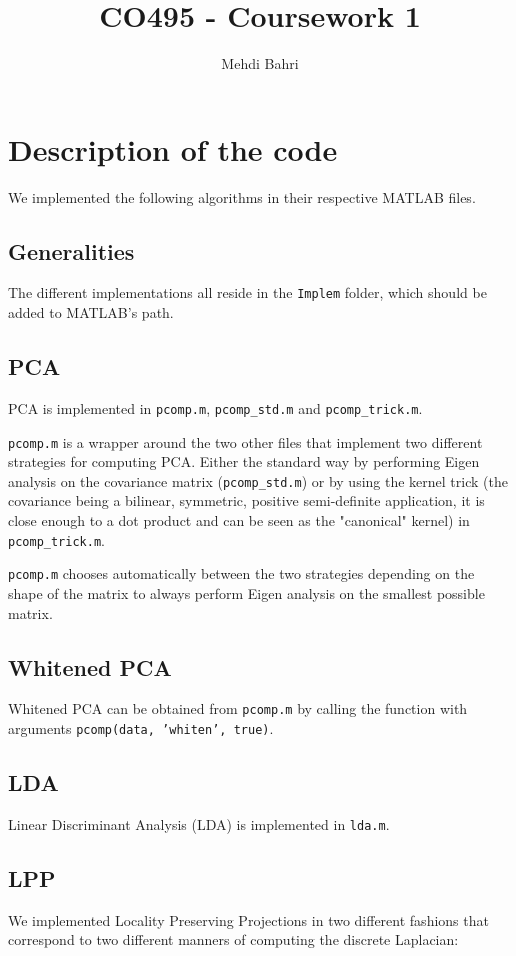 \documentclass[10pt, a4paper]{article}
\title{CO495 - Coursework 1}
\author{Mehdi Bahri}
\begin{document}
\maketitle

\tableofcontents

\section{Description of the code}
We implemented the following algorithms in their respective MATLAB files.

\subsection{Generalities}
The different implementations all reside in the \texttt{Implem} folder, which should be added to MATLAB's path.

\subsection{PCA}
PCA is implemented in \texttt{pcomp.m}, \texttt{pcomp\_std.m} and \texttt{pcomp\_trick.m}.

\texttt{pcomp.m} is a wrapper around the two other files that implement two different strategies for computing PCA. Either the standard way by performing Eigen analysis on the covariance matrix (\texttt{pcomp\_std.m}) or by using the kernel trick (the covariance being a bilinear, symmetric, positive semi-definite application, it is close enough to a dot product and can be seen as the "canonical" kernel) in \texttt{pcomp\_trick.m}.

\texttt{pcomp.m} chooses automatically between the two strategies depending on the shape of the matrix to always perform Eigen analysis on the smallest possible matrix.

\subsection{Whitened PCA}

Whitened PCA can be obtained from \texttt{pcomp.m} by calling the function with arguments \texttt{pcomp(data, 'whiten', true)}.

\subsection{LDA}
Linear Discriminant Analysis (LDA) is implemented in \texttt{lda.m}.

\subsection{LPP}
We implemented Locality Preserving Projections in two different fashions that correspond to two different manners of computing the discrete Laplacian:
\end{document}
